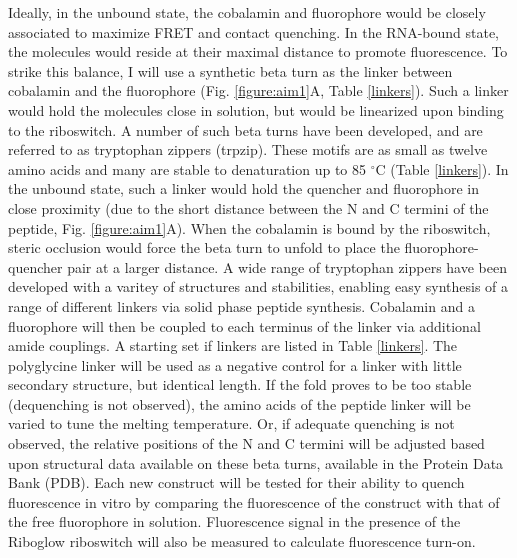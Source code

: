 Ideally, in the unbound state, the cobalamin and fluorophore would be closely associated to maximize FRET and contact quenching\cite{RosendahlSynthesisbiologicalactivity1982,ShellVitaminB12Tunable2015,ShellTunableVisibleNearIR2014}.
In the RNA-bound state, the molecules would reside at their maximal distance to promote fluorescence\cite{LeeDesignSynthesisCharacterization2009}.
To strike this balance, I will use a synthetic beta turn as the linker between cobalamin and the fluorophore (Fig. \ref{figure:aim1}A, Table \ref{linkers}).
Such a linker would hold the molecules close in solution, but would be linearized upon binding to the riboswitch.
A number of such beta turns have been developed, and are referred to as tryptophan zippers (trpzip)\cite{CochranTryptophanzippersStable2001}.
These motifs are as small as twelve amino acids and many are stable to denaturation up to 85 $^\circ$C (Table \ref{linkers}).
In the unbound state, such a linker would hold the quencher and fluorophore in close proximity (due to the short distance between the N and C termini of the peptide, Fig. \ref{figure:aim1}A).
When the cobalamin is bound by the riboswitch, steric occlusion would force the beta turn to unfold to place the fluorophore-quencher pair at a larger distance.
A wide range of tryptophan zippers have been developed with a varitey of structures and stabilities, enabling easy synthesis of a range of different linkers via solid phase peptide synthesis\cite{CochranTryptophanzippersStable2001,KierProbingLowerSize2008,AndersenMinimizationOptimizationDesigned2006,FesinmeyerEnhancedHairpinStability2004}.
Cobalamin and a fluorophore will then be coupled to each terminus of the linker via additional amide couplings\cite{JackowskaVitaminB12derivatives2018}.
A starting set if linkers are listed in Table \ref{linkers}.
The polyglycine linker will be used as a negative control for a linker with little secondary structure, but identical length.
If the fold proves to be too stable (dequenching is not observed), the amino acids of the peptide linker will be varied to tune the melting temperature.
Or, if adequate quenching is not observed, the relative positions of the N and C termini will be adjusted based upon structural data available on these beta turns, available in the Protein Data Bank (PDB).
Each new construct will be tested for their ability to quench fluorescence in vitro by comparing the fluorescence of the construct with that of the free fluorophore in solution. Fluorescence signal in the presence of the Riboglow riboswitch will also be measured to calculate fluorescence turn-on.

